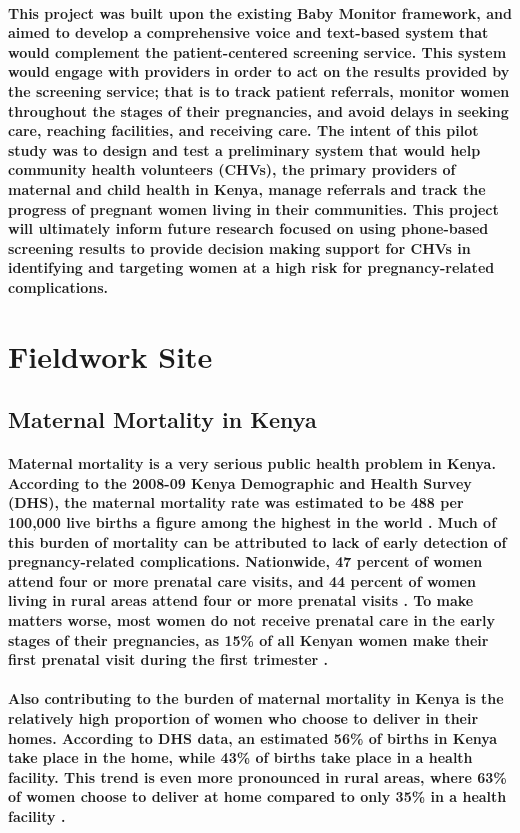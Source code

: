 \paragraph{This project was built upon the existing Baby Monitor framework, and aimed to develop a comprehensive voice and text-based system that would complement the patient-centered screening service. This system would engage with providers in order to act on the results provided by the screening service; that is to track patient referrals, monitor women throughout the stages of their pregnancies, and avoid delays in seeking care, reaching facilities, and receiving care. The intent of this pilot study was to design and test a preliminary system that would help community health volunteers (CHVs), the primary providers of maternal and child health in Kenya, manage referrals and track the progress of pregnant women living in their communities. This project will ultimately inform future research focused on using phone-based screening results to provide decision making support for CHVs in identifying and targeting women at a high risk for pregnancy-related complications.}

\section{Fieldwork Site}
\subsection{Maternal Mortality in Kenya}
\paragraph{Maternal mortality is a very serious public health problem in Kenya. According to the 2008-09 Kenya Demographic and Health Survey (DHS), the maternal mortality rate was estimated to be 488 per 100,000 live births \textemdash a figure among the highest in the world \citep{DHS2010}. Much of this burden of mortality can be attributed to lack of early detection of pregnancy-related complications. Nationwide, 47 percent of women attend four or more prenatal care visits, and 44 percent of women living in rural areas attend four or more prenatal visits \citep{DHS2010}. To make matters worse, most women do not receive prenatal care in the early stages of their pregnancies, as 15\% of all Kenyan women make their first prenatal visit during the first trimester \citep{DHS2010}.}

\paragraph{Also contributing to the burden of maternal mortality in Kenya is the relatively high proportion of women who choose to deliver in their homes. According to DHS data, an estimated 56\% of births in Kenya take place in the home, while 43\% of births take place in a health facility. This trend is even more pronounced in rural areas, where 63\% of women choose to deliver at home compared to only 35\% in a health facility \citep{DHS2010}.}

